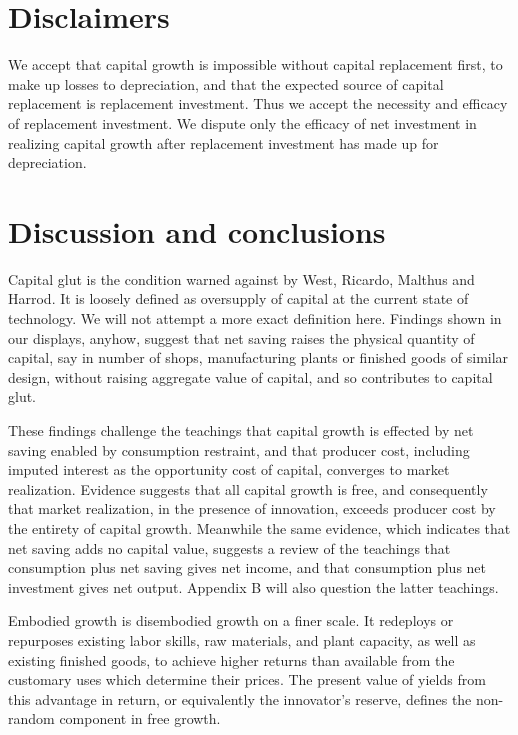\documentclass[a4paper,fleqn]{latex_styles/cas-sc}
\begin{document}
\hypertarget{disclaimers}{%
\section{Disclaimers}\label{disclaimers}}

We accept that capital growth is impossible without capital replacement first, to make up losses to depreciation, and that the expected source of capital replacement is replacement investment. Thus we accept the necessity and efficacy of replacement investment. We dispute only the efficacy of net investment in realizing capital growth after replacement investment has made up for depreciation.

\hypertarget{discussion-and-conclusions}{%
\section{Discussion and conclusions}\label{discussion-and-conclusions}}

Capital glut is the condition warned against by West, Ricardo, Malthus
and Harrod. It is loosely defined as oversupply of capital at the
current state of technology. We will not attempt a more exact definition
here. Findings shown in our displays, anyhow, suggest that net
saving raises the physical quantity of capital, say in number of
shops, manufacturing plants or finished goods of similar design, without
raising aggregate value of capital, and so contributes to capital glut.

These findings challenge the teachings that capital growth is effected
by net saving enabled by consumption restraint, and that producer
cost, including imputed interest as the opportunity cost of capital,
converges to market realization. Evidence suggests that all capital growth is free, and
consequently that market realization, in the presence of innovation,
exceeds producer cost by the entirety of capital growth. Meanwhile the same evidence, which indicates that net saving adds no capital value, suggests a review of the teachings that consumption plus net saving gives net income, and that consumption plus net investment gives net output. Appendix B will also question the latter teachings.

Embodied growth is disembodied growth on a finer scale. It redeploys or
repurposes existing labor skills, raw materials, and plant capacity, as
well as existing finished goods, to achieve higher returns than
available from the customary uses which determine their prices. The
present value of yields from this advantage in return, or equivalently
the innovator's reserve, defines the non-random component in free growth.
\end{document}

